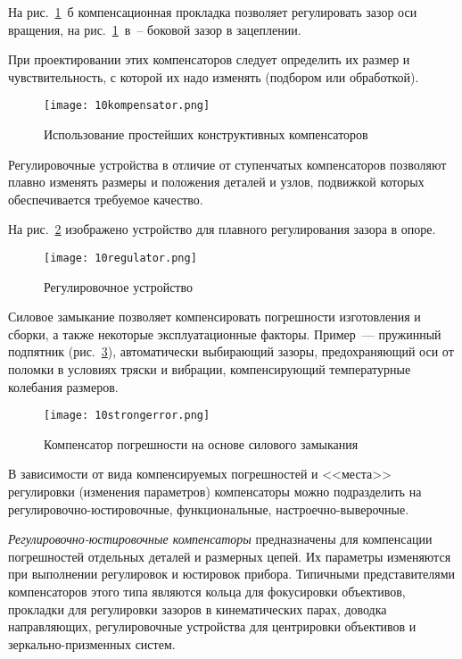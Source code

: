 На рис.~\ref{pic:10kompensator}~б компенсационная прокладка позволяет регулировать зазор оси вращения, на рис.~\ref{pic:10kompensator}~в~-- боковой зазор в зацеплении.

При проектировании этих компенсаторов следует определить их размер и чувствительность, с которой их надо изменять (подбором или обработкой).

\begin{figure}[h!]
	\caption{ Использование простейших конструктивных компенсаторов }
	\texttt{[image: 10kompensator.png]}
	\label{pic:10kompensator}
\end{figure}

Регулировочные устройства в отличие от ступенчатых компенсаторов позволяют плавно изменять размеры и положения деталей и узлов, подвижкой которых обеспечивается требуемое качество.

На рис.~\ref{pic:10regulator} изображено устройство для плавного регулирования зазора в опоре.

\begin{figure}[h!]
	\caption{ Регулировочное устройство }
	\texttt{[image: 10regulator.png]}
	\label{pic:10regulator}
\end{figure}

Силовое замыкание позволяет компенсировать погрешности изготовления и сборки, а также некоторые эксплуатационные факторы. Пример~--- пружинный подпятник (рис.~\ref{pic:10strongerror}), автоматически выбирающий зазоры, предохраняющий оси от поломки в условиях тряски и вибрации, компенсирующий температурные колебания размеров.

\begin{figure}[h!]
	\caption{ Компенсатор погрешности на основе силового замыкания }
	\texttt{[image: 10strongerror.png]}
	\label{pic:10strongerror}
\end{figure}

В зависимости от вида компенсируемых погрешностей и <<места>> регулировки (изменения параметров) компенсаторы можно подразделить на регулировочно-юстировочные, функциональные, настроечно-выверочные.

\textit{Регулировочно-юстировочные компенсаторы} предназначены для компенсации погрешностей отдельных деталей и размерных цепей. Их параметры изменяются при выполнении регулировок и юстировок прибора. Типичными представителями компенсаторов этого типа являются кольца для фокусировки объективов, прокладки для регулировки зазоров в кинематических парах, доводка направляющих, регулировочные устройства для центрировки объективов и зеркально-призменных систем.

